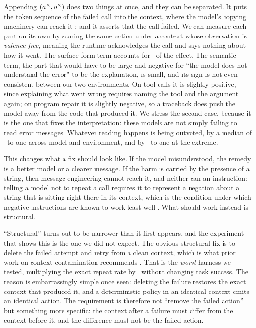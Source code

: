Appending $(a^{\times}, o^{\times})$ does two things at once, and they can be
separated. It puts the token sequence of the failed call into the context, where
the model's copying machinery can reach it
\citep{olsson2022induction,xu2022breaktheloop}; and it asserts that the call
failed. We can measure each part on its own by scoring the same action under a
context whose observation is \emph{valence-free}, meaning the runtime
acknowledges the call and says nothing about how it went. The surface-form term
accounts for \CopyShare\ of the effect. The semantic term, the part that would
have to be large and negative for ``the model does not understand the error'' to
be the explanation, is small, and its sign is not even consistent between our
two environments. On tool calls it is slightly positive, since explaining what
went wrong requires naming the tool and the argument again; on program repair it
is slightly negative, so a traceback does push the model away from the code that
produced it. We stress the second case, because it is the one that fixes the
interpretation: these models are not simply failing to read error messages.
Whatever reading happens is being outvoted, by a median of \MedianCopySemRatio\
to one across model and environment, and by \MaxCopySemRatio\ to one at the
extreme.

This changes what a fix should look like. If the model misunderstood, the remedy
is a better model or a clearer message. If the harm is carried by the presence of
a string, then message engineering cannot reach it, and neither can an
instruction: telling a model not to repeat a call requires it to represent a
negation about a string that is sitting right there in its context, which is the
condition under which negative instructions are known to work least well
\citep{castricato2024pinkelephants,negation2025pinkelephant}. What should work
instead is structural.

``Structural'' turns out to be narrower than it first appears, and the
experiment that shows this is the one we did not expect. The obvious structural
fix is to delete the failed attempt and retry from a clean context, which is what
prior work on context contamination recommends \citep{yang2026contamination}.
That is the \emph{worst} harness we tested, multiplying the exact repeat rate by
\DropRepeatRatio\ without changing task success. The reason is embarrassingly
simple once seen: deleting
the failure restores the exact context that produced it, and a deterministic
policy in an identical context emits an identical action. The requirement is
therefore not ``remove the failed action'' but something more specific: the
context after a failure must differ from the context before it, and the
difference must not be the failed action.


